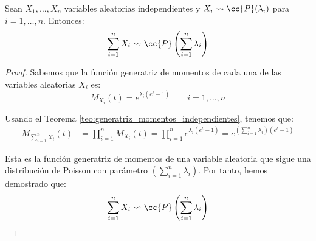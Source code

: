 \begin{prop}
    Sean $X_1, \dots, X_n$ variables aleatorias independientes y $X_i\leadsto \cc{P}(\lambda_i)$ para $i=1,\dots,n$. Entonces:
    \begin{equation*}
        \sum_{i=1}^{n}X_i \leadsto \cc{P}\left(\sum_{i=1}^{n}\lambda_i\right)
    \end{equation*}

    \begin{proof}
        Sabemos que la función generatriz de momentos de cada una de las variables aleatorias $X_i$ es:
        \begin{equation*}
            M_{X_i}(t) = e^{\lambda_i(e^t-1)} \qquad i=1,\dots,n
        \end{equation*}

        Usando el Teorema \ref{teo:generatriz_momentos_independientes}, tenemos que:
        \begin{align*}
            M_{\sum\limits_{i=1}^{n}X_i}(t) &= \prod_{i=1}^{n}M_{X_i}(t) = \prod_{i=1}^{n}e^{\lambda_i(e^t-1)} = e^{\left(\sum\limits_{i=1}^{n}\lambda_i\right)(e^t-1)}
        \end{align*}

        Esta es la función generatriz de momentos de una variable aleatoria que sigue una distribución de Poisson con parámetro $\left(\sum\limits_{i=1}^{n}\lambda_i\right)$. Por tanto, hemos demostrado que:
        \begin{equation*}
            \sum_{i=1}^{n}X_i \leadsto \cc{P}\left(\sum_{i=1}^{n}\lambda_i\right)
        \end{equation*}
    \end{proof}
\end{prop}

